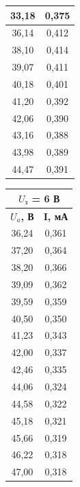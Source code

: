 \documentclass[a4paper,12pt]{article}
\begin{document}
\begin{table}[h]
\begin{minipage}{0.3\textwidth}
\begin{tabular}{|cc|}
	\multicolumn{1}{|c|}{33,18} & 0,375 \\ \hline
	\multicolumn{1}{|c|}{36,14} & 0,412 \\ \hline
	\multicolumn{1}{|c|}{38,10} & 0,414 \\ \hline
	\multicolumn{1}{|c|}{39,07} & 0,411 \\ \hline
	\multicolumn{1}{|c|}{40,18} & 0,401 \\ \hline
	\multicolumn{1}{|c|}{41,20} & 0,392 \\ \hline
	\multicolumn{1}{|c|}{42,06} & 0,390 \\ \hline
	\multicolumn{1}{|c|}{43,16} & 0,388 \\ \hline
	\multicolumn{1}{|c|}{43,98} & 0,389 \\ \hline
	\multicolumn{1}{|c|}{44,47} & 0,391 \\ \hline
	\end{tabular}
\end{minipage}
\begin{minipage}{0.3\textwidth}
\begin{tabular}{|cc|}
\hline
\multicolumn{2}{|c|}{\textbf{$U_з$   = 6 В}} \\ \hline
\multicolumn{1}{|c|}{\textbf{$U_a$, В}} & \textbf{I, мА} \\ \hline
\multicolumn{1}{|c|}{36,24} & 0,361 \\ \hline
\multicolumn{1}{|c|}{37,20} & 0,364 \\ \hline
\multicolumn{1}{|c|}{38,20} & 0,366 \\ \hline
\multicolumn{1}{|c|}{39,09} & 0,362 \\ \hline
\multicolumn{1}{|c|}{39,59} & 0,359 \\ \hline
\multicolumn{1}{|c|}{40,50} & 0,350 \\ \hline
\multicolumn{1}{|c|}{41,23} & 0,343 \\ \hline
\multicolumn{1}{|c|}{42,00} & 0,337 \\ \hline
\multicolumn{1}{|c|}{42,46} & 0,335 \\ \hline
\multicolumn{1}{|c|}{44,06} & 0,324 \\ \hline
\multicolumn{1}{|c|}{44,58} & 0,322 \\ \hline
\multicolumn{1}{|c|}{45,18} & 0,321 \\ \hline
\multicolumn{1}{|c|}{45,66} & 0,319 \\ \hline
\multicolumn{1}{|c|}{46,22} & 0,318 \\ \hline
\multicolumn{1}{|c|}{47,00} & 0,318 \\ \hline

\end{tabular}
\end{minipage}
\end{table}
\end{document}
